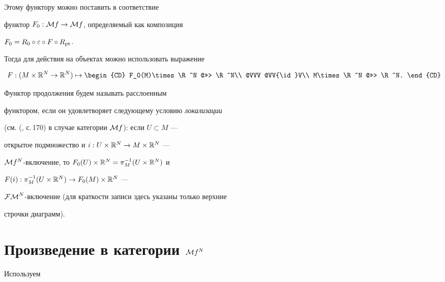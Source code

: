 \smallskip





\noindent{}Этому функтору можно поставить в соответствие


функтор $F_0:{\cal M} f\rightarrow{\cal M} f$, определяемый как композиция


$F_0=R_0\circ\varepsilon\circ F\circ R_{\operatorname{pt}}$.


Тогда для действия на объектах можно использовать выражение


$$


F:(M\times\R^N\to\R^N)\mapsto


\begin{CD}


F_0(M)\times\R^N @>>> \R^N\\


@VVV @VV{\id}V\\


M\times\R^N @>>> \R^N.


\end{CD}


$$


Функтор продолжения будем называть расслоенным


функтором, если он удовлетворяет следующему условию {\it локализации}


(см. (\cite{KMS}, с.\,170) в случае категории ${\cal M} f$): если $U\subset M$ ---


открытое подмножество и $i:U\times{\Bbb R}^N\rightarrow M\times{\Bbb R}^N$ ---


${\cal M} f^N$-включение, то $F_0(U)\times{\Bbb R}^N=\pi^{-1}_M(U\times{\Bbb R}^N)$ и


$F(i):\pi^{-1}_M(U\times{\Bbb R}^N)\rightarrow F_0(M)\times{\Bbb R}^N$ ---


${\cal{FM}}^N$-включение (для краткости записи здесь указаны только верхние


строчки диаграмм).








\section{Произведение в категории ${\cal M} f^N$}





Используем








